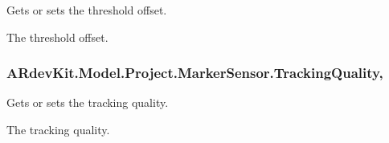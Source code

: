 Gets or sets the threshold offset. 

The threshold offset. \hypertarget{class_a_rdev_kit_1_1_model_1_1_project_1_1_marker_sensor_ad8681106fa33f5473799f0e0ed6999bc}{
\subsubsection[{Tracking\-Quality}]{ A\-Rdev\-Kit.\-Model.\-Project.\-Marker\-Sensor.\-Tracking\-Quality\hspace{0.3cm}{\ttfamily [get]}, {\ttfamily [set]}}}\label{class_a_rdev_kit_1_1_model_1_1_project_1_1_marker_sensor_ad8681106fa33f5473799f0e0ed6999bc}


Gets or sets the tracking quality. 

The tracking quality. 